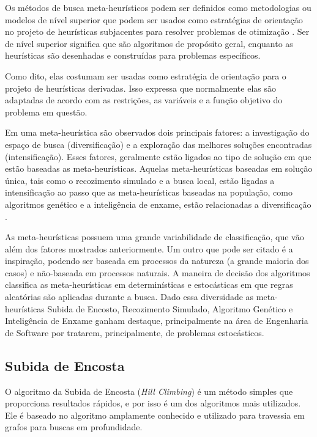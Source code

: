 Os métodos de busca meta-heurísticos podem ser definidos como metodologias ou 
modelos de nível superior que podem ser usados como estratégias de orientação
no projeto de heurísticas subjacentes para resolver problemas de
otimização \cite{talbi2009metaheuristics}. Ser de nível superior significa que são algoritmos de propósito geral, enquanto as heurísticas são desenhadas e construídas para  problemas específicos.

Como dito, elas costumam ser usadas como estratégia de orientação para o projeto de heurísticas derivadas. Isso expressa que normalmente elas são adaptadas de acordo com as restrições, as variáveis e a função objetivo do problema em questão.

Em uma meta-heurística são observados dois principais fatores: a investigação do espaço de busca (diversificação) e a exploração das melhores soluções encontradas (intensificação). Esses fatores, geralmente estão ligados ao tipo de solução em que estão baseadas as meta-heurísticas. Aquelas meta-heurísticas baseadas em solução única, tais como o recozimento simulado e a busca local, estão ligadas a intensificação ao passo que as meta-heurísticas baseadas na população, como algoritmos genético e a inteligência de enxame, estão relacionadas a diversificação \cite{talbi2009metaheuristics}.

As meta-heurísticas possuem uma grande variabilidade de classificação, que vão além dos fatores mostrados anteriormente. Um outro que pode ser citado é a inspiração, podendo ser baseada em processos da natureza (a grande maioria dos casos) e não-baseada em processos naturais. A maneira de decisão dos algoritmos classifica as meta-heurísticas em determinísticas e estocásticas em que regras aleatórias são aplicadas durante a busca. Dado essa diversidade as meta-heurísticas Subida de Encosto, Recozimento Simulado,  Algoritmo Genético e  Inteligência de Enxame ganham destaque, principalmente na área de Engenharia de Software \cite{khari2017extensive} por tratarem, principalmente, de problemas estocásticos.

\subsection{Subida de Encosta}

O algoritmo da Subida de Encosta (\textit{Hill Climbing}) é um método simples que proporciona resultados rápidos, e por isso é um dos algoritmos mais utilizados. Ele é baseado no algoritmo amplamente conhecido e utilizado para travessia em grafos para buscas em profundidade.


